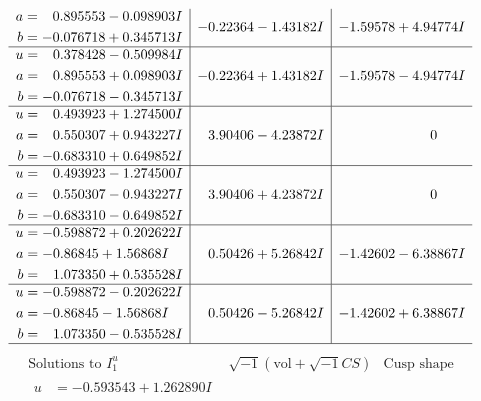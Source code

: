 \documentclass[1p]{elsarticle_modified}
\theoremstyle{definition}
\newcommand{\I}{\sqrt{-1}}
\begin{document}
$$\begin{array}{c|c|c}
\begin{aligned}
a &= \phantom{-}0.895553 - 0.098903 I \\
b &= -0.076718 + 0.345713 I\end{aligned}
 & -0.22364 - 1.43182 I & -1.59578 + 4.94774 I \\ \hline\begin{aligned}
u &= \phantom{-}0.378428 - 0.509984 I \\
a &= \phantom{-}0.895553 + 0.098903 I \\
b &= -0.076718 - 0.345713 I\end{aligned}
 & -0.22364 + 1.43182 I & -1.59578 - 4.94774 I \\ \hline\begin{aligned}
u &= \phantom{-}0.493923 + 1.274500 I \\
a &= \phantom{-}0.550307 + 0.943227 I \\
b &= -0.683310 + 0.649852 I\end{aligned}
 & \phantom{-}3.90406 - 4.23872 I & \phantom{-0.000000 } 0 \\ \hline\begin{aligned}
u &= \phantom{-}0.493923 - 1.274500 I \\
a &= \phantom{-}0.550307 - 0.943227 I \\
b &= -0.683310 - 0.649852 I\end{aligned}
 & \phantom{-}3.90406 + 4.23872 I & \phantom{-0.000000 } 0 \\ \hline\begin{aligned}
u &= -0.598872 + 0.202622 I \\
a &= -0.86845 + 1.56868 I \\
b &= \phantom{-}1.073350 + 0.535528 I\end{aligned}
 & \phantom{-}0.50426 + 5.26842 I & -1.42602 - 6.38867 I \\ \hline\begin{aligned}
u &= -0.598872 - 0.202622 I \\
a &= -0.86845 - 1.56868 I \\
b &= \phantom{-}1.073350 - 0.535528 I\end{aligned}
 & \phantom{-}0.50426 - 5.26842 I & -1.42602 + 6.38867 I\\
 \hline 
 \end{array}$$\newpage$$\begin{array}{c|c|c}  
\text{Solutions to }I^u_{1}& \I (\text{vol} + \sqrt{-1}CS) & \text{Cusp shape}\\
 \hline 
\begin{aligned}
u &= -0.593543 + 1.262890 I \\

\end{aligned}
\end{array}$$
\end{document}
